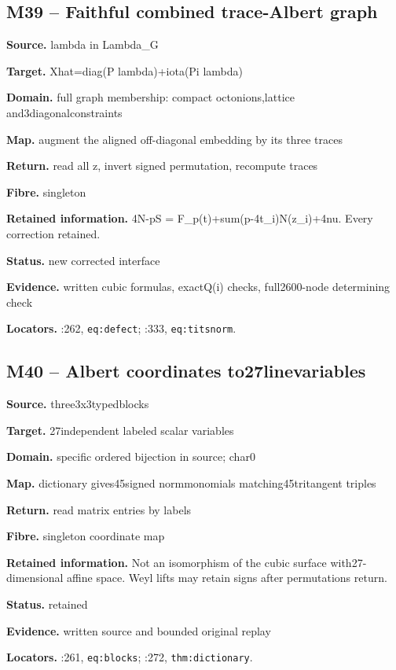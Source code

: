 \subsection*{M39 -- Faithful combined trace-Albert graph}
\noindent\textbf{Source.} lambda in Lambda\_G\par
\noindent\textbf{Target.} Xhat=diag(P lambda)+iota(Pi lambda)\par
\noindent\textbf{Domain.} full graph membership: compact octonions,lattice and3diagonalconstraints\par
\noindent\textbf{Map.} augment the aligned off-diagonal embedding by its three traces\par
\noindent\textbf{Return.} read all z, invert signed permutation, recompute traces\par
\noindent\textbf{Fibre.} singleton\par
\noindent\textbf{Retained information.} 4N-pS = F\_p(t)+sum(p-4t\_i)N(z\_i)+4nu. Every correction retained.\par
\noindent\textbf{Status.} new corrected interface\par
\noindent\textbf{Evidence.} written cubic formulas, exactQ(i) checks, full2600-node determining check\par
\noindent\textbf{Locators.} :262, \texttt{eq:defect}; :333, \texttt{eq:titsnorm}.
\subsection*{M40 -- Albert coordinates to27linevariables}
\noindent\textbf{Source.} three3x3typedblocks\par
\noindent\textbf{Target.} 27independent labeled scalar variables\par
\noindent\textbf{Domain.} specific ordered bijection in source; char0\par
\noindent\textbf{Map.} dictionary gives45signed normmonomials matching45tritangent triples\par
\noindent\textbf{Return.} read matrix entries by labels\par
\noindent\textbf{Fibre.} singleton coordinate map\par
\noindent\textbf{Retained information.} Not an isomorphism of the cubic surface with27-dimensional affine space. Weyl lifts may retain signs after permutations return.\par
\noindent\textbf{Status.} retained\par
\noindent\textbf{Evidence.} written source and bounded original replay\par
\noindent\textbf{Locators.} :261, \texttt{eq:blocks}; :272, \texttt{thm:dictionary}.
